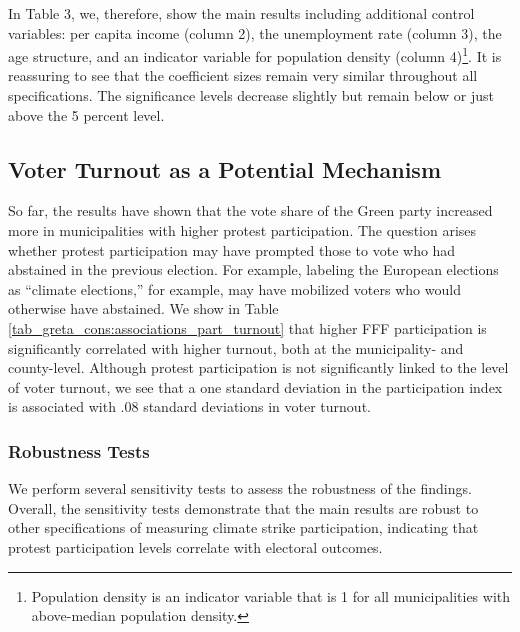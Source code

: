 In Table 3, we, therefore, show the main results including additional control variables: per capita income (column 2), the unemployment rate (column 3), the age structure, and an indicator variable for population density (column 4)\footnote{Population density is an indicator variable that is 1 for all municipalities with above-median population density.}. It is reassuring to see that the coefficient sizes remain very similar throughout all specifications. The significance levels decrease slightly but remain below or just above the 5 percent level. 

\subsection{Voter Turnout as a Potential Mechanism}



So far, the results have shown that the vote share of the Green party increased more in municipalities with higher protest participation. The question arises whether protest participation may have prompted those to vote who had abstained in the previous election. For example, labeling the European elections as “climate elections,” for example, may have mobilized voters who would otherwise have abstained. We show in Table \ref{tab_greta_cons:associations_part_turnout} that higher FFF participation is significantly correlated with higher turnout, both at the municipality- and county-level. Although protest participation is not significantly linked to the level of voter turnout, we see that a one standard deviation in the participation index is associated with .08 standard deviations in voter turnout.


\subsubsection{Robustness Tests}

We perform several sensitivity tests to assess the robustness of the findings. Overall, the sensitivity tests demonstrate that the main results are robust to other specifications of measuring climate strike participation, indicating that protest participation levels correlate with electoral outcomes.



